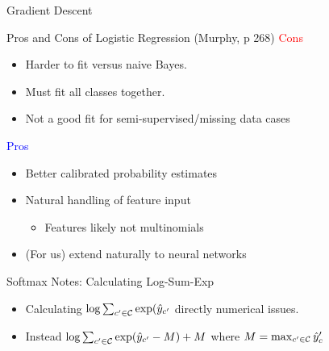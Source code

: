 \documentclass{beamer}
\begin{document}
\begin{frame}{Gradient Descent}
  \begin{figure}
    \begin{algorithmic}
      \EndFor{}
      \EndWhile{}
      \State{\Return{$\theta$}}
    \end{algorithmic}
  \end{figure}  
\end{frame}


\begin{frame}{Pros and Cons of Logistic Regression (Murphy, p 268)}
  \textcolor{red}{Cons}
  \begin{itemize}
  \item Harder to fit versus naive Bayes.
  \item Must fit all classes together.
  \item Not a good fit for semi-supervised/missing data cases

  \end{itemize}
  \textcolor{blue}{Pros}
  \begin{itemize}
  \item Better calibrated probability estimates
  \item Natural handling of feature input 
 
    \begin{itemize}
    \item Features likely not multinomials
    \end{itemize}

  \item (For us) extend naturally to neural networks 
  \end{itemize}
\end{frame}


\begin{frame}{Softmax Notes: Calculating Log-Sum-Exp}
  \begin{itemize}
  \item Calculating $\log \sum_{c' \in \mathcal{C}} \exp(\hat{y}_{c'}$ directly numerical issues.
  \item Instead $\log \sum_{c' \in \mathcal{C}} \exp(\hat{y}_{c'} - M) + M$ where $M = \max_{c'\in\mathcal{C}} \hat{y}_c'$ 
  \end{itemize}
\end{frame}
\end{document}

